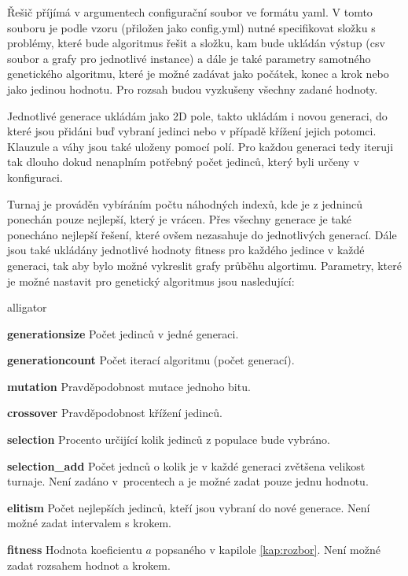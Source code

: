 \documentclass[11pt]{article}
\begin{document}
Řešič příjímá v argumentech configurační soubor ve formátu yaml. V tomto souboru je podle vzoru (přiložen jako config.yml) nutné specifikovat složku s problémy, které bude algoritmus řešit a složku, kam bude ukládán výstup (csv soubor a grafy pro jednotlivé instance) a dále je také parametry samotného genetického algoritmu, které je možné zadávat jako počátek, konec a krok nebo jako jedinou hodnotu. Pro rozsah budou vyzkušeny všechny zadané hodnoty. 

Jednotlivé generace ukládám jako 2D pole, takto ukládám i novou generaci, do které jsou přidáni buď vybraní jedinci nebo v případě křížení jejich potomci. Klauzule a váhy jsou také uloženy pomocí polí. Pro každou generaci tedy iteruji tak dlouho dokud nenaplním potřebný počet jedinců, který byli určeny v konfiguraci.

Turnaj je prováděn vybíráním počtu náhodných indexů, kde je z jedninců ponechán pouze nejlepší, který je vrácen. Přes všechny generace je také ponecháno nejlepší řešení, které ovšem nezasahuje do jednotlivých generací. Dále jsou také ukládány jednotlivé hodnoty fitness pro každého jedince v každé generaci, tak aby bylo možné vykreslit grafy průběhu algortimu. Parametry, které je možné nastavit pro genetický algoritmus jsou nasledující:

\begin{labeling}{alligator}
\item[\textbf{generationsize}] Počet jedinců v jedné generaci.
\item[\textbf{generationcount}] Počet iterací algoritmu (počet generací).
\item[\textbf{mutation}] Pravděpodobnost mutace jednoho bitu.
\item[\textbf{crossover}] Pravděpodobnost křížení jedinců.
\item[\textbf{selection}] Procento určijící kolik jedinců z populace bude vybráno.
\item[\textbf{selection\_add}] Počet jednců o kolik je v každé generaci zvětšena velikost turnaje. Není zadáno v~procentech a je možné zadat pouze jednu hodnotu.
\item[\textbf{elitism}] Počet nejlepších jedinců, kteří jsou vybraní do nové generace. Není možné zadat intervalem s krokem.
\item[\textbf{fitness}] Hodnota koeficientu $a$ popsaného v kapilole \ref{kap:rozbor}. Není možné zadat rozsahem hodnot a krokem.
\end{labeling}
\end{document}

